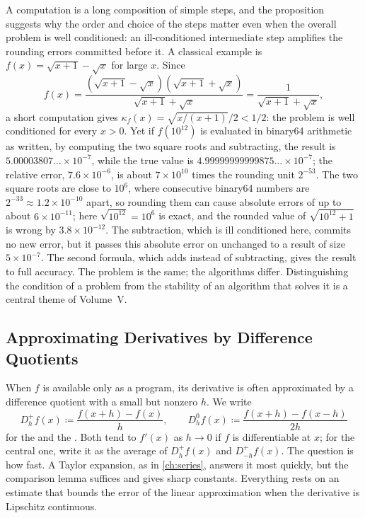 A computation is a long composition of simple steps, and the proposition suggests why the order and choice of the steps matter even when the overall problem is well conditioned: an ill-conditioned intermediate step amplifies the rounding errors committed before it. A classical example is $f(x)=\sqrt{x+1}-\sqrt x$ for large $x$. Since
\[
f(x)=\frac{(\sqrt{x+1}-\sqrt x)(\sqrt{x+1}+\sqrt x)}{\sqrt{x+1}+\sqrt x}=\frac1{\sqrt{x+1}+\sqrt x},
\]
a short computation gives $\kappa_f(x)=\sqrt{x/(x+1)}/2<1/2$: the problem is well conditioned for every $x>0$. Yet if $f(10^{12})$ is evaluated in binary64 arithmetic as written, by computing the two square roots and subtracting, the result is $5.00003807\ldots\times10^{-7}$, while the true value is $4.99999999999875\ldots\times10^{-7}$; the relative error, $7.6\times10^{-6}$, is about $7\times10^{10}$ times the rounding unit $2^{-53}$. The two square roots are close to $10^6$, where consecutive binary64 numbers are $2^{-33}\approx1.2\times10^{-10}$ apart, so rounding them can cause absolute errors of up to about $6\times10^{-11}$; here $\sqrt{10^{12}}=10^6$ is exact, and the rounded value of $\sqrt{10^{12}+1}$ is wrong by $3.8\times10^{-12}$. The subtraction, which is ill conditioned here, commits no new error, but it passes this absolute error on unchanged to a result of size $5\times10^{-7}$. The second formula, which adds instead of subtracting, gives the result to full accuracy. The problem is the same; the algorithms differ. Distinguishing the condition of a problem from the stability of an algorithm that solves it is a central theme of Volume~V.

\subsection{Approximating Derivatives by Difference Quotients}

When $f$ is available only as a program, its derivative is often approximated by a difference quotient with a small but nonzero $h$. We write
\[
D_h^+f(x)\coloneqq\frac{f(x+h)-f(x)}h,\qquad D_h^0f(x)\coloneqq\frac{f(x+h)-f(x-h)}{2h}
\]
for the  and the . Both tend to $f'(x)$ as $h\to0$ if $f$ is differentiable at $x$; for the central one, write it as the average of $D_h^+f(x)$ and $D_{-h}^+f(x)$. The question is how fast. A Taylor expansion, as in \cref{ch:series}, answers it most quickly, but the comparison lemma suffices and gives sharp constants. Everything rests on an estimate that bounds the error of the linear approximation when the derivative is Lipschitz continuous.


